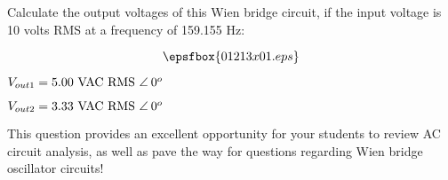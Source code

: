 

Calculate the output voltages of this Wien bridge circuit, if the input voltage is 10 volts RMS at a frequency of 159.155 Hz:

$$\epsfbox{01213x01.eps}$$







$V_{out1} = 5.00 \hbox{ VAC RMS } \angle \> 0^o$

\vskip 10pt

$V_{out2} = 3.33 \hbox{ VAC RMS } \angle \> 0^o$







This question provides an excellent opportunity for your students to review AC circuit analysis, as well as pave the way for questions regarding Wien bridge oscillator circuits!  




